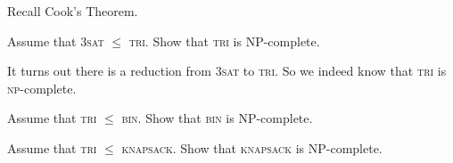 Recall Cook's Theorem. 


\frmrule

\begin{example}
Assume that \textsc{3sat} $\leqslant$ \textsc{tri}. 
Show that \textsc{tri} is NP-complete.
\end{example}

\frmrule

It turns out there is a reduction from 
\textsc{3sat} to \textsc{tri}. So we indeed know that 
\textsc{tri} is \textsc{np}-complete.

\frmrule

\begin{example}
Assume that \textsc{tri} $\leqslant$ \textsc{bin}. 
Show that \textsc{bin} is NP-complete.
\end{example}

\frmrule

\begin{example}
Assume that \textsc{tri} $\leqslant$ \textsc{knapsack}. 
Show that \textsc{knapsack} is NP-complete.
\end{example}

\frmrule

